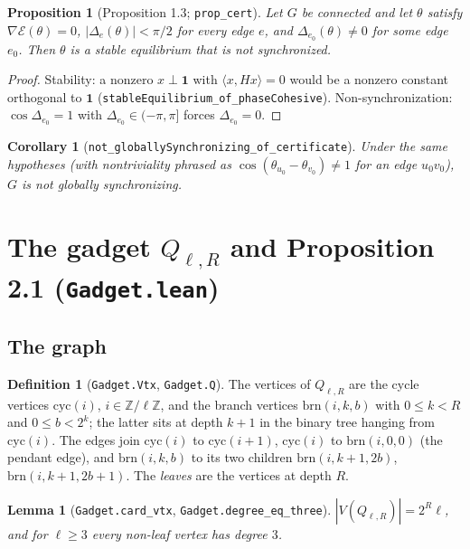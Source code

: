 \documentclass[11pt]{amsart}
\newcommand{\leanname}[1]{\texttt{\textcolor{black!75}{#1}}}
\newcommand{\lfile}[1]{\texttt{#1}}
\newcommand{\E}{\mathcal{E}}
\newcommand{\Z}{\mathbb{Z}}
\newcommand{\one}{\mathbf{1}}
\newcommand{\Q}{Q_{\ell,R}}
\theoremstyle{plain}
\newtheorem{lemma}[theorem]{Lemma}
\newtheorem{proposition}[theorem]{Proposition}
\newtheorem{corollary}[theorem]{Corollary}
\theoremstyle{definition}
\newtheorem{definition}[theorem]{Definition}
\theoremstyle{remark}
\begin{document}
\begin{proposition}[Proposition 1.3; \leanname{prop\_cert}]\label{prop:cert}
Let $G$ be connected and let $\theta$ satisfy $\nabla\E(\theta)=0$, $|\Delta_e(\theta)|<\pi/2$
for every edge $e$, and $\Delta_{e_0}(\theta)\ne0$ for some edge $e_0$. Then $\theta$ is a stable
equilibrium that is not synchronized.
\end{proposition}
\begin{proof}
Stability: a nonzero $x\perp\one$ with $\langle x,Hx\rangle=0$ would be a nonzero constant
orthogonal to $\one$ (\leanname{stableEquilibrium\_of\_phaseCohesive}). Non-synchronization:
$\cos\Delta_{e_0}=1$ with $\Delta_{e_0}\in(-\pi,\pi]$ forces $\Delta_{e_0}=0$.
\end{proof}

\begin{corollary}[\leanname{not\_globallySynchronizing\_of\_certificate}]
Under the same hypotheses (with nontriviality phrased as $\cos(\theta_{u_0}-\theta_{v_0})\ne1$
for an edge $u_0v_0$), $G$ is not globally synchronizing.
\end{corollary}

\section{The gadget $\Q$ and Proposition 2.1 (\lfile{Gadget.lean})}

\subsection{The graph}

\begin{definition}[\leanname{Gadget.Vtx}, \leanname{Gadget.Q}]
The vertices of $\Q$ are the cycle vertices $\mathrm{cyc}(i)$, $i\in\Z/\ell\Z$, and the branch
vertices $\mathrm{brn}(i,k,b)$ with $0\le k<R$ and $0\le b<2^k$; the latter sits at depth $k+1$
in the binary tree hanging from $\mathrm{cyc}(i)$. The edges join $\mathrm{cyc}(i)$ to
$\mathrm{cyc}(i+1)$, $\mathrm{cyc}(i)$ to $\mathrm{brn}(i,0,0)$ (the pendant edge), and
$\mathrm{brn}(i,k,b)$ to its two children $\mathrm{brn}(i,k+1,2b)$, $\mathrm{brn}(i,k+1,2b+1)$.
The \emph{leaves} are the vertices at depth $R$.
\end{definition}

\begin{lemma}[\leanname{Gadget.card\_vtx}, \leanname{Gadget.degree\_eq\_three}]
$|V(\Q)|=2^R\ell$, and for $\ell\ge3$ every non-leaf vertex has degree $3$.
\end{lemma}
\end{document}
